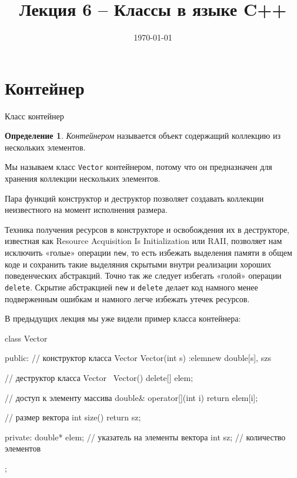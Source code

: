 \documentclass[
    8pt,
    hyperref={pdfencoding=unicode}
    ]{beamer}
\title{Лекция 6 – Классы в языке C++}
\institute{Кафедра прикладной математики и информатики}
\date{\today}
\theoremstyle{definition}
\newtheorem{myDef}{Определение}
\begin{document}
\titlepage 
\section{Контейнер}

\begin{frame}{Класс контейнер}
    \begin{myDef}
        \emph{Контейнером} называется объект содержащий коллекцию из нескольких элементов.
    \end{myDef}
    Мы называем класс \texttt{Vector} контейнером, потому что он предназначен для хранения коллекции нескольких элементов.

    
    Пара функций конструктор и деструктор позволяет создавать коллекции неизвестного на 
    момент исполнения размера.
    
    Техника получения ресурсов в конструкторе и освобождения их в деструкторе, 
    известная как Resource Acquisition Is Initialization или RAII, 
    позволяет нам исключить «голые» операции \texttt{new}, то есть избежать
    выделения памяти в общем коде и сохранить такие выделяния скрытыми внутри реализации
    хороших поведенческих абстракций.
    Точно так же следует избегать «голой» операции \texttt{delete}. Скрытие абстракцией \texttt{new} и \texttt{delete} делает код намного менее подверженным ошибкам и намного легче избежать утечек ресурсов.
    
    \newpage
    В предыдущих лекция мы уже видели пример класса контейнера:
    
        \begin{cppcode}
        class Vector {
            public:
            // конструктор класса Vector
            Vector(int s) :elem{new double[s]}, sz{s} { } 
            
            // деструктор класса Vector
            ~Vector(){ delete[] elem; }
            
            // доступ к элементу массива
            double& operator[](int i) { return elem[i]; } 
            
            // размер вектора
            int size() { return sz; }
            
            private:
            double* elem; // указатель на элементы вектора
            int sz; // количество элементов
        };
    \end{cppcode}    
\end{frame}
\end{document}
